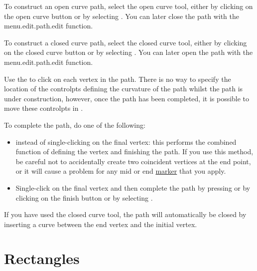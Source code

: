 
To construct an open curve \gls{path}, select the open curve tool,
either by clicking on the open curve button or by selecting
. You can later close the \gls{path}
with the \gls{menu.edit.path.edit} function.


To construct a closed curve \gls{path}, select the closed curve tool,
either by clicking on the closed curve button or by selecting
. You can later open the \gls{path}
with the \gls{menu.edit.path.edit} function.

Use the  to click on each vertex in
the \gls*{path}.  There is no way to specify the location of the
\glspl{controlpt} defining the curvature of the \gls*{path} whilst the
\gls*{path} is under construction, however, once the
\gls*{path} has been completed, it is possible to move these
\glspl*{controlpt} in \editpathmode.

To complete the \gls*{path}, do one of the following:
\begin{itemize}
\item {} instead of single-clicking
on the final vertex: this performs the combined function of defining
the vertex and finishing the path. If you use this method, be
careful not to accidentally create two coincident vertices at the
end point, or it will cause a problem for any mid or end
\hyperref[sec:markers]{marker} that you apply.

\item Single-\gls{click} on the final vertex and then
complete the path by pressing  or by
clicking on the finish button or by selecting
.
\end{itemize}
If you have used the closed curve tool, the path will automatically
be closed by inserting a curve between the end vertex
and the initial vertex.


\section{Rectangles}\label{sec:rectangles}


